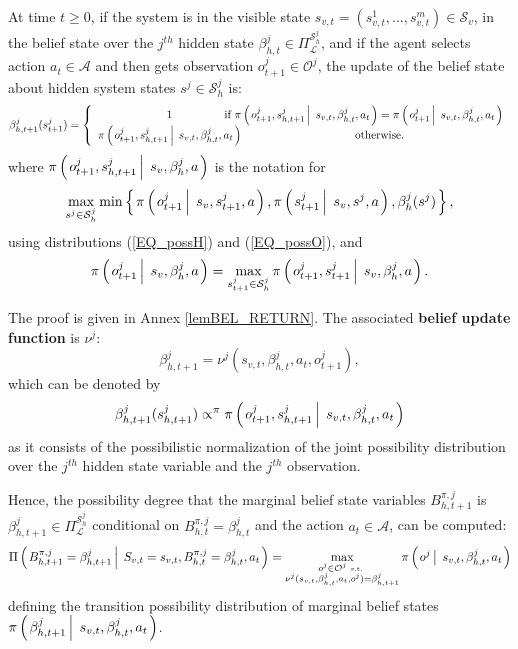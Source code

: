 \begin{Lemma}
\label{lemBEL}
At time $t \geqslant 0$, 
if the system is in the visible state $s_{v,t} = (s^1_{v,t},\ldots,s^m_{v,t}) \in \mathcal{S}_v$,
in the belief state over the $j^{th}$ hidden state $\beta^j_{h,t} \in \Pi^{\mathcal{S}^j_h}_{\mathcal{L}}$, 
and if the agent selects action $a_t \in \mathcal{A}$ 
and then gets observation $o^j_{t+1} \in \mathcal{O}^j$, 
the update of the belief state about hidden system states $s^j \in \mathcal{S}^j_h$ is:
\begin{equation} 
\label{beliefUpdateJ} 
\beta^j_{h,t+1}(s^j_{t+1}) = \left \{ 
\begin{array}{cc} 
\displaystyle 1 & \hspace{-1cm}  \mbox{ if }  \pi \paren{o^j_{t+1},s^j_{h,t+1} \sachant s_{v,t}, \beta^j_{h,t},a_t } = \pi \paren{o^j_{t+1} \sachant s_{v,t}, \beta^j_{h,t}, a_t } \\
 \pi \paren{o^j_{t+1},s^j_{h,t+1} \sachant s_{v,t}, \beta^j_{h,t}, a_t} & \mbox{ otherwise}. 
\end{array} \right. 
\end{equation}
where $\pi \left( \left.  o^j_{t+1}, s^j_{h,t+1} \, \right| \left. \, s_v, \beta^j_h, a  \right. \right) $ is the notation for
\[ \max_{s^j \in \mathcal{S}^j_h} \min \left\{ \left.  \pi \left( \left.  o^j_{t+1} \, \right| \left. \, s_v, s^j_{t+1}, a \right. \right) , \pi \left( \left.  s^j_{t+1} \, \right| \left. \, s_v, s^j, a \right. \right), \beta^j_h(s^j)  \right. \right\}, \]
using distributions (\ref{EQ_possH}) and (\ref{EQ_possO}),
and \[ \pi \left( \left.  o^j_{t+1} \, \right| \left. \, s_v, \beta^j_h, a   \right. \right) = \max_{s^j_{t+1} \in \mathcal{S}^j_h} \pi \left( \left.  o^j_{t+1}, s^j_{t+1} \, \right| \left. \, s_v, \beta^j_h, a  \right. \right).\]
\end{Lemma}
The proof is given in Annex \ref{lemBEL_RETURN}.
The associated \textbf{belief update function} is $\nu^j$:
\[ \beta^j_{h,t+1} = \nu^j(s_{v,t},\beta^j_{h,t},a_t,o^j_{t+1}), \]
which can be denoted by 
\[ \beta^j_{h,t+1}(s^j_{h,t+1}) \propto^{\pi} \pi \left( \left. o^j_{t+1},s^j_{h,t+1} \, \right| \left. \, s_{v,t}, \beta^j_{h,t}, a_t \right. \right) \]
as it consists of the possibilistic normalization 
of the joint possibility distribution over the $j^{th}$ hidden state variable
and the $j^{th}$ observation.

Hence, the possibility degree that the marginal belief state variables $B^{\pi,j}_{h,t+1}$ is $\beta^j_{h,t+1} \in \Pi^{\mathcal{S}^j_h}_{\mathcal{L}}$
conditional on $B^{\pi,j}_{h,t} = \beta^j_{h,t}$ and the action $a_t \in \mathcal{A}$, 
can be computed:
\begin{equation}
\label{trans_marg_belief}
 \Pi \left( \left.  B^{\pi,j}_{h,t+1} = \beta^j_{h,t+1} \, \right| \left. \, S_{v,t} = s_{v,t}, B^{\pi,j}_{h,t} = \beta^j_{h,t}, a_t  \right. \right) = \max_{\substack{ o^j \in \mathcal{O}^j \mbox{ \tiny s.t. } \\ \nu^j(s_{v,t},\beta^j_{h,t},a_t,o^j) = \beta^j_{h,t+1}}} \pi \left( \left.  o^j \, \right| \left. \, s_{v,t}, \beta^j_{h,t}, a_t   \right. \right)
\end{equation}
defining the transition possibility distribution of marginal belief states
$\pi \left( \left.  \beta^j_{h,t+1} \, \right| \left. \, s_{v,t}, \beta^j_{h,t}, a_t  \right. \right)$.


